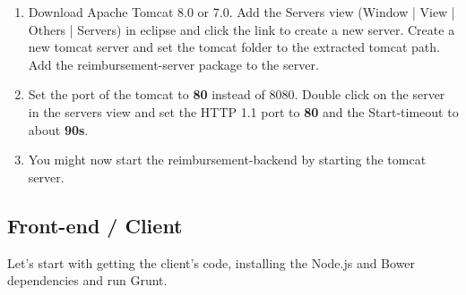 \begin{enumerate}
	\item  Download Apache Tomcat 8.0 or 7.0. Add the Servers view (Window | View | Others | Servers) in eclipse and click the link to create a new server. Create a new tomcat server and set the tomcat folder to the extracted tomcat path. Add the reimbursement-server package to the server.
	\item Set the port of the tomcat to \textbf{80} instead of 8080. Double click on the server in the servers view and set the HTTP 1.1 port to \textbf{80} and the Start-timeout to about \textbf{90s}.	
	\item  You might now start the reimbursement-backend by starting the tomcat server.
\end{enumerate}

\subsection{Front-end / Client}
\label{installation:client}
Let's start with getting the client's code, installing the Node.js and Bower dependencies and run Grunt.
